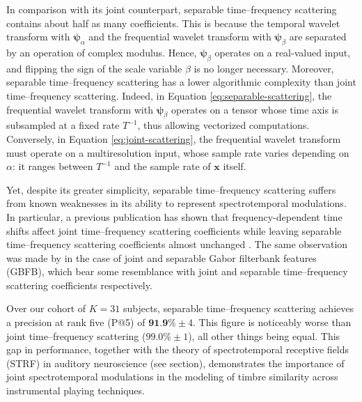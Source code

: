 \documentclass{bmcart}
\newcommand{\lnameref}[1]{%
\bgroup
\let\nmu\MakeLowercase
\nameref{#1}\egroup}
\newcommand{\nmu}{}
\begin{document}
In comparison with its joint counterpart, separable time--frequency scattering contains about half as many coefficients.
This is because the temporal wavelet transform with $\boldsymbol{\psi}_\alpha$ and the frequential wavelet transform with $\boldsymbol{\psi}_\beta$ are separated by an operation of complex modulus.
Hence, $\boldsymbol{\psi}_\beta$ operates on a real-valued input, and flipping the sign of the scale variable $\beta$ is no longer necessary.
Moreover, separable time--frequency scattering has a lower algorithmic complexity than joint time--frequency scattering.
Indeed, in Equation \ref{eq:separable-scattering}, the frequential wavelet transform with $\boldsymbol{\psi}_{\beta}$ operates on a tensor whose time axis is subsampled at a fixed rate $T^{-1}$, thus allowing vectorized computations.
Conversely, in Equation \ref{eq:joint-scattering}, the frequential wavelet transform must operate on a multiresolution input, whose sample rate varies  depending on $\alpha$: it ranges between $T^{-1}$ and the sample rate of $\boldsymbol{x}$ itself.

Yet, despite its greater simplicity, separable time--frequency scattering suffers from known weaknesses in its ability to represent spectrotemporal modulations.
In particular, a previous publication has shown that frequency-dependent time shifts affect joint time--frequency scattering coefficients while leaving separable time--frequency scattering coefficients almost unchanged \cite{anden2019tsp}.
The same observation was made by \cite{schadler2015jasa} in the case of joint and separable Gabor filterbank features (GBFB), which bear some resemblance with joint and separable time--frequency scattering coefficients respectively.

Over our cohort of $K=31$ subjects, separable time--frequency scattering achieves a precision at rank five (P@5) of $\textbf{91.9\%} \pm 4$. This figure is noticeably worse than joint time--frequency scattering ($99.0\% \pm 1$), all other things being equal.
This gap in performance, together with the theory of spectrotemporal receptive fields (STRF) in auditory neuroscience (see \lnameref{sec:related-work} section), demonstrates the importance of joint spectrotemporal modulations in the modeling of timbre similarity across instrumental playing techniques.
\end{document}

